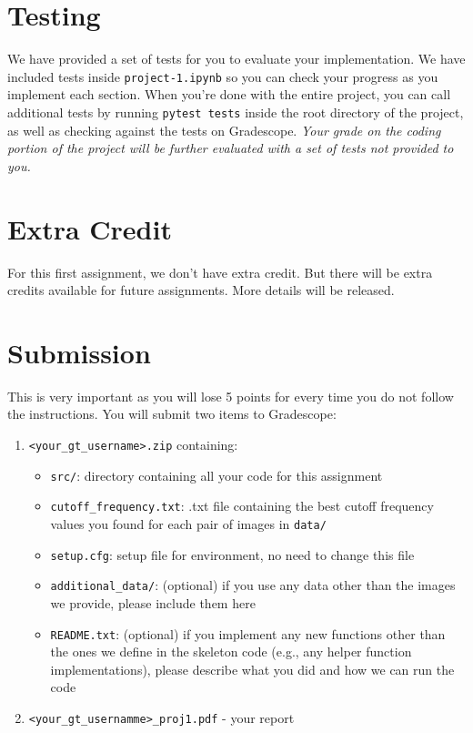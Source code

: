 \documentclass{article}
\begin{document}
\section*{Testing}
We have provided a set of tests for you to evaluate your implementation. We have included tests inside \lstinline{project-1.ipynb} so you can check your progress as you implement each section. When you're done with the entire project, you can call additional tests by running \lstinline{pytest tests} inside the root directory of the project, as well as checking against the tests on Gradescope. \textit{Your grade on the coding portion of the project will be further evaluated with a set of tests not provided to you.}

\section*{Extra Credit}
For this first assignment, we don't have extra credit. But there will be extra credits available for future assignments. More details will be released.


\section*{Submission}

This is very important as you will lose 5 points for every time you do not follow the instructions. You will submit two items to Gradescope:
\begin{enumerate}
    \item \lstinline{<your_gt_username>.zip} containing:
    \begin{itemize}
        \item \lstinline{src/}: directory containing all your code for this assignment
        \item \lstinline{cutoff_frequency.txt}: .txt file containing the best cutoff frequency values you found for each pair of images in \lstinline{data/}
        \item \lstinline{setup.cfg}: setup file for environment, no need to change this file
        \item \lstinline{additional_data/}: (optional) if you use any data other than the images we provide, please include them here
        \item \lstinline{README.txt}: (optional) if you implement any new functions other than the ones we define in the skeleton code (e.g., any helper function implementations), please describe what you did and how we can run the code
    \end{itemize}
    \item \lstinline{<your_gt_usernamme>_proj1.pdf} - your report
\end{enumerate}
\end{document}
